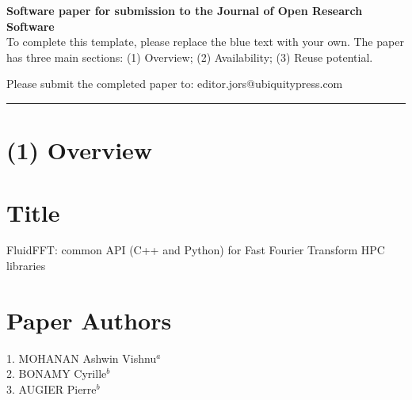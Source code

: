 

{\bf Software paper for submission to the Journal of Open Research Software} \\

To complete this template, please replace the blue text with your own. The
paper has three main sections: (1) Overview; (2) Availability; (3) Reuse
potential.

Please submit the completed paper to: editor.jors@ubiquitypress.com

\rule{\textwidth}{1pt}

\section{(1) Overview}

\vspace{0.5cm}

\section{Title}


FluidFFT: common API (C++ and Python) for Fast Fourier Transform HPC libraries

\section{Paper Authors}


1. MOHANAN Ashwin Vishnu$^a$\\
2. BONAMY Cyrille$^b$\\
3. AUGIER Pierre$^b$\\

\smallskip

